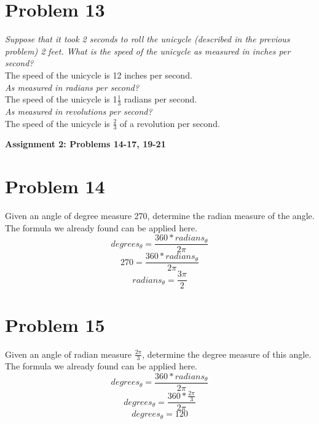 \documentclass[11pt]{article} %
\newcommand\tab[1][1cm]{\hspace*{#1}}
\begin{document}
\section{Problem 13}
\textit{Suppose that it took 2 seconds to roll the unicycle (described in the previous problem) 2 feet. What is the speed of the unicycle as measured in inches per second?}\\
\tab The speed of the unicycle is 12 inches per second. 
\\ \textit{As measured in radians per second?}\\
\tab The speed of the unicycle is 1$\frac{1}{3}$ radians per second.
\\ \textit{As measured in revolutions per second?}
\\
\tab The speed of the unicycle is $\frac{2}{3}$ of a revolution per second.
\newpage

\textbf{Assignment 2: Problems 14-17, 19-21}
\\
\section{Problem 14}
Given an angle of degree measure 270, determine the radian measure of the angle.
\tab The formula we already found can be applied here. 
\begin{displaymath} degrees_\theta = \frac{360*radians_\theta}{2\pi} \end{displaymath} 
\begin{displaymath} 270 = \frac{360*radians_\theta}{2\pi} \end{displaymath} 
\begin{displaymath} radians_\theta = \frac{3\pi}{2} \end{displaymath} 

\section{Problem 15} 
Given an angle of radian measure $\frac{2\pi}{3}$, determine the degree measure of this angle.
\tab The formula we already found can be applied here. 
\begin{displaymath} degrees_\theta = \frac{360*radians_\theta}{2\pi} \end{displaymath} 
\begin{displaymath} degrees_\theta = \frac{360*\frac{2\pi}{3}}{2\pi} \end{displaymath} 
\begin{displaymath} degrees_\theta = 120  \end{displaymath} 
\end{document}
